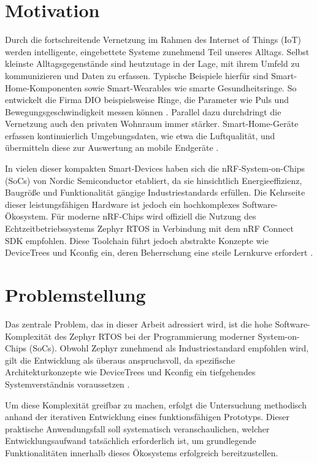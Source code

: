 
\section{Motivation}
Durch die fortschreitende Vernetzung im Rahmen des Internet of Things (IoT) werden intelligente, eingebettete Systeme zunehmend Teil unseres Alltags. Selbst kleinste Alltagsgegenstände sind heutzutage in der Lage, mit ihrem Umfeld zu kommunizieren und Daten zu erfassen. Typische Beispiele hierfür sind Smart-Home-Komponenten sowie Smart-Wearables wie smarte Gesundheitsringe. So entwickelt die Firma DIO beispielsweise Ringe, die Parameter wie Puls und Bewegungsgeschwindigkeit messen können \cite{noauthor_smart_nodate}. Parallel dazu durchdringt die Vernetzung auch den privaten Wohnraum immer stärker. Smart-Home-Geräte erfassen kontinuierlich Umgebungsdaten, wie etwa die Luftqualität, und übermitteln diese zur Auswertung an mobile Endgeräte \cite{noauthor_smart_nodate-1}.

In vielen dieser kompakten Smart-Devices haben sich die nRF-System-on-Chips (SoCs) von Nordic Semiconductor etabliert, da sie hinsichtlich Energieeffizienz, Baugröße und Funktionalität gängige Industriestandards erfüllen. Die Kehrseite dieser leistungsfähigen Hardware ist jedoch ein hochkomplexes Software-Ökosystem. Für moderne nRF-Chips wird offiziell die Nutzung des Echtzeitbetriebssystems Zephyr RTOS in Verbindung mit dem nRF Connect SDK empfohlen. Diese Toolchain führt jedoch abstrakte Konzepte wie DeviceTrees und Kconfig ein, deren Beherrschung eine steile Lernkurve erfordert \cite{noauthor_nordic_2023, noauthor_25_nodate}.

\section{Problemstellung}
\label{sec:Aufgabenstellung}
Das zentrale Problem, das in dieser Arbeit adressiert wird, ist die hohe Software-Komplexität des Zephyr RTOS bei der Programmierung moderner System-on-Chips (SoCs). Obwohl Zephyr zunehmend als Industriestandard empfohlen wird, gilt die Entwicklung als überaus anspruchsvoll, da spezifische Architekturkonzepte wie DeviceTrees und Kconfig ein tiefgehendes Systemverständnis voraussetzen \cite{noauthor_25_nodate}.

Um diese Komplexität greifbar zu machen, erfolgt die Untersuchung methodisch anhand der iterativen Entwicklung eines funktionsfähigen Prototyps. Dieser praktische Anwendungsfall soll systematisch veranschaulichen, welcher Entwicklungsaufwand tatsächlich erforderlich ist, um grundlegende Funktionalitäten innerhalb dieses Ökosystems erfolgreich bereitzustellen.

